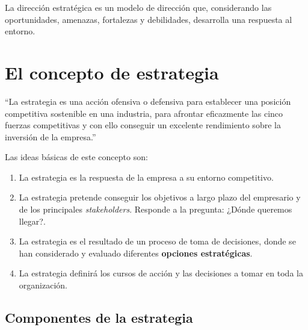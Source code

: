\documentclass[10pt,a4paper,spanish]{report}
\begin{document}
            La dirección estratégica es un modelo de dirección que, considerando las oportunidades, amenazas, fortalezas y debilidades, desarrolla una respuesta al entorno.

      \section{\textcolor[rgb]{0.4,0.9,0.6}El concepto de estrategia}

            ``La estrategia es una acción ofensiva o defensiva para establecer una posición competitiva sostenible en una industria, para afrontar eficazmente las cinco fuerzas competitivas y con ello conseguir un excelente rendimiento sobre la inversión de la empresa.''

            Las ideas básicas de este concepto son:
            \begin{enumerate}[1.]
                  \item La estrategia es la respuesta de la empresa a su entorno competitivo.
                  \item La estrategia pretende conseguir los objetivos a largo plazo del empresario y de los principales \textit{\textcolor[rgb]{0.4,0.9,0.6}{stakeholders}}. Responde a la pregunta: ¿Dónde queremos llegar?.
                  \item La estrategia es el resultado de un proceso de toma de decisiones, donde se han considerado y evaluado diferentes \textbf{opciones estratégicas}.
                  \item La estrategia definirá los cursos de acción y las decisiones a tomar en toda la organización.
            \end{enumerate}

            \subsection{\textcolor[rgb]{0.4,0.9,0.6}Componentes de la estrategia}
\end{document}
